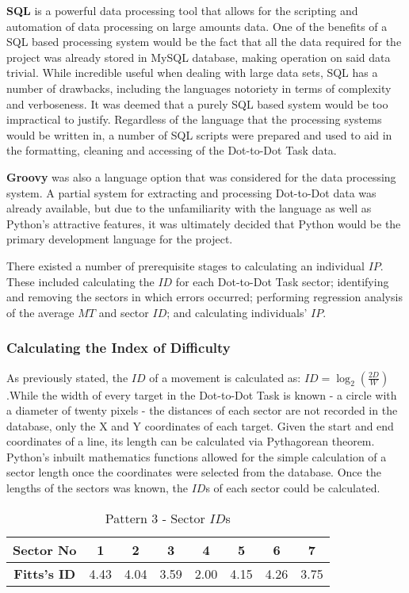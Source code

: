 		\textbf{SQL} is a powerful data processing tool that allows for the scripting and automation of data processing on large amounts data. One of the benefits of a SQL based processing system would be the fact that all the data required for the project was already stored in MySQL database, making operation on said data trivial. While incredible useful when dealing with large data sets, SQL has a number of drawbacks, including the languages notoriety in terms of complexity and verboseness. It was deemed that a purely SQL based system would be too impractical to justify. Regardless of the language that the processing systems would be written in, a number of SQL scripts were prepared and used to aid in the formatting, cleaning and accessing of the Dot-to-Dot Task data.
		
		\textbf{Groovy} was also a language option that was considered for the data processing system. A partial system for extracting and processing Dot-to-Dot data was already available, but due to the unfamiliarity with the language as well as Python's attractive features, it was ultimately decided that Python would be the primary development language for the project.
		
		There existed a number of prerequisite stages to calculating an individual \(IP\). These included calculating the \(ID\) for each Dot-to-Dot Task sector; identifying and removing the sectors in which errors occurred; performing regression analysis of the average \(MT\) and sector \(ID\); and calculating individuals’ \(IP\).
		
		\subsubsection{Calculating the Index of Difficulty}
			As previously stated, the \(ID\) of a movement is calculated as: \(ID = \log_2\left( \frac{2D}{W}\right)\).While the width of every target in the Dot-to-Dot Task is known -  a circle with a diameter of twenty pixels - the distances of each sector are not recorded in the database, only the X and Y coordinates of each target. Given the start and end coordinates of a line, its length can be calculated via Pythagorean theorem. Python’s inbuilt mathematics functions allowed for the simple calculation of a sector length once the coordinates were selected from the database. Once the lengths of the sectors was known, the \(ID\)s of each sector could be calculated. 
			
			\begin{table}[h]
				\centering
				\caption{Pattern 3 - Sector \(ID\)s}
				\label{tab_pat_3_id}
				\begin{tabular}{|c|c|c|c|c|c|c|c|}
					\hline
					\textbf{Sector No}  & 1    & 2    & 3    & 4    & 5    & 6    & 7    \\ \hline
					\textbf{Fitts's ID} & 4.43 & 4.04 & 3.59 & 2.00 & 4.15 & 4.26 & 3.75 \\ \hline
				\end{tabular}
			\end{table}
			
